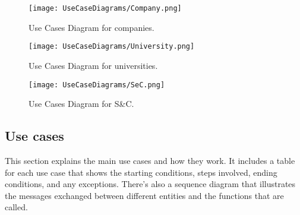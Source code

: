 \begin{figure}[H]
    \begin{center}
        \texttt{[image: UseCaseDiagrams/Company.png]}
        \caption{Use Cases Diagram for companies.} 
        \label{fig:CompanyUC}%
    \end{center}
\end{figure}

\begin{figure}[H]
    \begin{center}
        \texttt{[image: UseCaseDiagrams/University.png]}
        \caption{Use Cases Diagram for universities.} 
        \label{fig:UniversityUC}%
    \end{center}
\end{figure}

\begin{figure}[H]
    \begin{center}
        \texttt{[image: UseCaseDiagrams/SeC.png]}
        \caption{Use Cases Diagram for S\&C.} 
        \label{fig:SeCUC}%
    \end{center}
\end{figure}

\newpage
\subsection{Use cases}
\label{subsec: use_cases}%
\setcounter{uc}{1}
\newcommand{\cuc}{\theuc\stepcounter{uc}}
This section explains the main use cases and how they work. It includes a table for each use case that shows the starting conditions, steps involved, ending conditions, and any exceptions. There's also a sequence diagram that illustrates the messages exchanged between different entities and the functions that are called. \\


